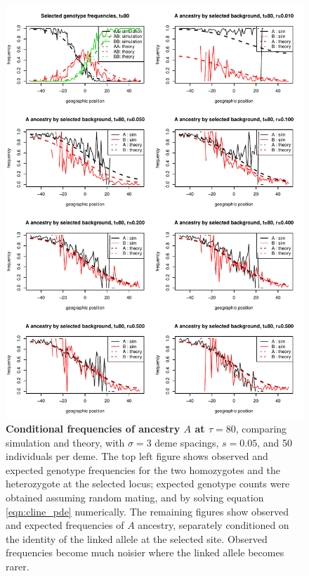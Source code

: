 \begin{figure}
    \includegraphics[height=0.8\textheight]{figs/cond_freqs_comparison_tau_80.pdf}
    \caption{
        \textbf{Conditional frequencies of ancestry $A$ at $\tau=80$},
        comparing simulation and theory, with $\sigma=3$ deme spacings, $s=0.05$, and 50 individuals per deme.
        The top left figure shows observed and expected genotype frequencies for the two homozygotes and the heterozygote at the selected locus;
        expected genotype counts were obtained assuming random mating,
        and by solving equation \eqref{eqn:cline_pde} numerically.
        The remaining figures show observed and expected frequencies of $A$ ancestry,
        separately conditioned on the identity of the linked allele at the selected site.
        Observed frequencies become much noisier where the linked allele becomes rarer.
    } \label{sfig:condAlleleFreq_tau80_comparison}
\end{figure}


